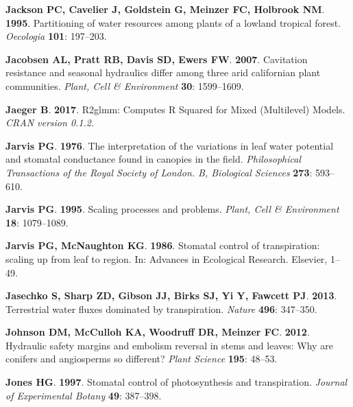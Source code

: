 \documentclass[11pt,twoside]{reedthesis}
\begin{document}
\hypertarget{ref-jackson_partitioning_1995}{}
\textbf{\textnormal{Jackson PC}, \textnormal{Cavelier J},
\textnormal{Goldstein G}, \textnormal{Meinzer FC}, \textnormal{Holbrook
NM}}. \textbf{1995}. Partitioning of water resources among plants of a
lowland tropical forest. \emph{Oecologia} \textbf{101}: 197--203.

\hypertarget{ref-Jacobsen2007}{}
\textbf{\textnormal{Jacobsen AL}, \textnormal{Pratt RB},
\textnormal{Davis SD}, \textnormal{Ewers FW}}. \textbf{2007}. Cavitation
resistance and seasonal hydraulics differ among three arid californian
plant communities. \emph{Plant, Cell \& Environment} \textbf{30}:
1599--1609.

\hypertarget{ref-jaeger_r2glmm_2017}{}
\textbf{\textnormal{Jaeger B}}. \textbf{2017}. R2glmm: Computes R
Squared for Mixed (Multilevel) Models. \emph{CRAN version 0.1.2.}

\hypertarget{ref-jarvis_interpretation_1976}{}
\textbf{\textnormal{Jarvis PG}}. \textbf{1976}. The interpretation of
the variations in leaf water potential and stomatal conductance found in
canopies in the field. \emph{Philosophical Transactions of the Royal
Society of London. B, Biological Sciences} \textbf{273}: 593--610.

\hypertarget{ref-Jarvis1995}{}
\textbf{\textnormal{Jarvis PG}}. \textbf{1995}. Scaling processes and
problems. \emph{Plant, Cell \& Environment} \textbf{18}: 1079--1089.

\hypertarget{ref-jarvis_stomatal_1986}{}
\textbf{\textnormal{Jarvis PG}, \textnormal{McNaughton KG}}.
\textbf{1986}. Stomatal control of transpiration: scaling up from leaf
to region. In: Advances in Ecological Research. Elsevier, 1--49.

\hypertarget{ref-Jasechko2013}{}
\textbf{\textnormal{Jasechko S}, \textnormal{Sharp ZD},
\textnormal{Gibson JJ}, \textnormal{Birks SJ}, \textnormal{Yi Y},
\textnormal{Fawcett PJ}}. \textbf{2013}. Terrestrial water fluxes
dominated by transpiration. \emph{Nature} \textbf{496}: 347--350.

\hypertarget{ref-johnson_hydraulic_2012}{}
\textbf{\textnormal{Johnson DM}, \textnormal{McCulloh KA},
\textnormal{Woodruff DR}, \textnormal{Meinzer FC}}. \textbf{2012}.
Hydraulic safety margins and embolism reversal in stems and leaves: Why
are conifers and angiosperms so different? \emph{Plant Science}
\textbf{195}: 48--53.

\hypertarget{ref-Jones1997}{}
\textbf{\textnormal{Jones HG}}. \textbf{1997}. Stomatal control of
photosynthesis and transpiration. \emph{Journal of Experimental Botany}
\textbf{49}: 387--398.
\end{document}
